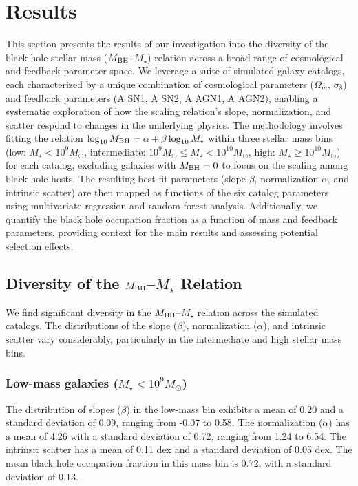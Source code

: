 \documentclass[twocolumn]{aastex631}
\begin{document}
\section{Results}
\label{sec:results}
This section presents the results of our investigation into the diversity of the black hole-stellar mass ($M_{\rm BH}$--$M_{\star}$) relation across a broad range of cosmological and feedback parameter space. We leverage a suite of simulated galaxy catalogs, each characterized by a unique combination of cosmological parameters ($\Omega_m$, $\sigma_8$) and feedback parameters (A\ensuremath{\_}{SN1}, A\ensuremath{\_}{SN2}, A\ensuremath{\_}{AGN1}, A\ensuremath{\_}{AGN2}), enabling a systematic exploration of how the scaling relation's slope, normalization, and scatter respond to changes in the underlying physics. The methodology involves fitting the relation $\log_{10} M_{\rm BH} = \alpha + \beta \log_{10} M_{\star}$ within three stellar mass bins (low: $M_{\star} < 10^9 M_{\odot}$, intermediate: $10^9 M_{\odot} \leq M_{\star} < 10^{10} M_{\odot}$, high: $M_{\star} \geq 10^{10} M_{\odot}$) for each catalog, excluding galaxies with $M_{\rm BH} = 0$ to focus on the scaling among black hole hosts. The resulting best-fit parameters (slope $\beta$, normalization $\alpha$, and intrinsic scatter) are then mapped as functions of the six catalog parameters using multivariate regression and random forest analysis. Additionally, we quantify the black hole occupation fraction as a function of mass and feedback parameters, providing context for the main results and assessing potential selection effects.

\subsection{Diversity of the $M_{\rm BH}$--$M_{\star}$ Relation}

We find significant diversity in the $M_{\rm BH}$--$M_{\star}$ relation across the simulated catalogs. The distributions of the slope ($\beta$), normalization ($\alpha$), and intrinsic scatter vary considerably, particularly in the intermediate and high stellar mass bins.

\subsubsection{Low-mass galaxies ($M_{\star} < 10^9 M_{\odot}$)}

The distribution of slopes ($\beta$) in the low-mass bin exhibits a mean of 0.20 and a standard deviation of 0.09, ranging from -0.07 to 0.58. The normalization ($\alpha$) has a mean of 4.26 with a standard deviation of 0.72, ranging from 1.24 to 6.54. The intrinsic scatter has a mean of 0.11 dex and a standard deviation of 0.05 dex. The mean black hole occupation fraction in this mass bin is 0.72, with a standard deviation of 0.13.
\end{document}
